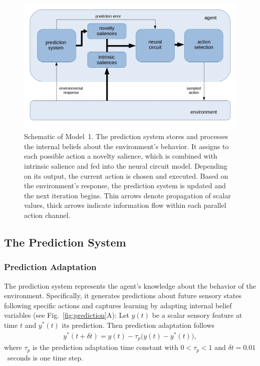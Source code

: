 \documentclass[a4paper]{scrreprt}
\begin{document}
\begin{figure}
\centering
\includegraphics[width=\linewidth]{figs/model_schematic/model_schematic1.jpg}
\caption{Schematic of Model~1. The prediction system stores and processes the internal beliefs about the environment's behavior. It assigns to each possible action a novelty salience, which is combined with intrinsic salience and fed into the neural circuit model. Depending on its output, the current action is chosen and executed. Based on the environment's response, the prediction system is updated and the next iteration begins. Thin arrows denote propagation of scalar values, thick arrows indicate information flow within each parallel action channel.}
\label{fig:model1}
\end{figure}


\subsection{The Prediction System}
\label{sec:pred_system}

\subsubsection{Prediction Adaptation}
\label{sec:pred_adaptation}

The prediction system represents the agent's knowledge about the behavior of the environment. Specifically, it generates predictions about future sensory states following specific actions and captures learning by adapting internal belief variables (see Fig.~\ref{fig:prediction}A):
Let $y(t)$ be a scalar sensory feature at time $t$ and $y^*(t)$ its prediction. Then prediction adaptation follows
\begin{align}
y^*(t+\delta t) = y(t) - \tau_p \bigl(y(t) - y^*(t)\bigr),
\end{align}
where $\tau_p$ is the prediction adaptation time constant with $0<\tau_p<1$ and $\delta t=0.01$~seconds is one time step.
\end{document}
